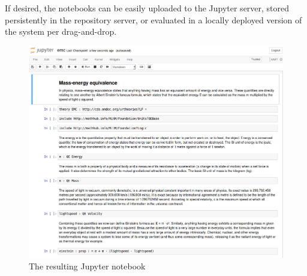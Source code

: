 If desired, the notebooks can be easily uploaded to the Jupyter server, stored persistently in the repository server, or evaluated in a locally deployed version of the system per drag-and-drop.

\begin{figure}[ht]\centering
\includegraphics[width=15cm]{../D4.11/conversionNotebook}
\caption{The resulting Jupyter notebook}
\label{fig:conversionNotebook}
\end{figure}


